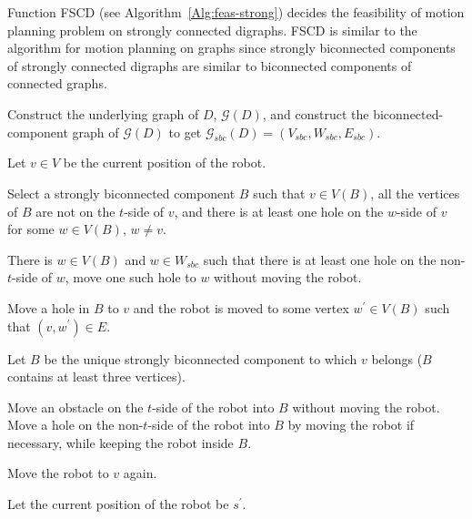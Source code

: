 \documentclass{article}
\begin{document}
Function FSCD (see Algorithm~\ref{Alg:feas-strong}) decides the
feasibility of motion planning problem on strongly connected
digraphs. FSCD is similar to the algorithm for motion planning on
graphs since strongly biconnected components of strongly connected
digraphs are similar to biconnected components of connected graphs.
\begin{algorithm}[ht]

\dontprintsemicolon \SetVline




Construct the underlying graph of $D$, $\mathcal{G}(D)$, and
construct the biconnected-component graph of $\mathcal{G}(D)$ to get
$\mathcal{G}_{sbc}(D)=(V_{sbc},W_{sbc},E_{sbc})$.\;

{
Let $v \in V$ be the current position of the robot.\;
{
Select a strongly biconnected component $B$ such that $v \in V(B)$, all the vertices of $B$ are not on the $t$-side of $v$,
    and there is at least one hole on the $w$-side of $v$ for some $w \in V(B)$, $w \ne v$.\;

{
There is $w \in V(B)$ and $w \in W_{sbc}$ such that there is at least one hole on the non-$t$-side of $w$,
      move one such hole to $w$ without moving the robot.
}

    Move a hole in $B$ to $v$ and the robot is moved to some vertex $w^\prime \in V(B)$ such that $(v,w^\prime) \in E$.\;
}
{
Let $B$ be the unique strongly biconnected component to which $v$ belongs ($B$ contains at least three vertices).\;

{
Move an obstacle on the $t$-side of the robot into $B$ without moving the robot.
}
Move a hole on the non-$t$-side of the robot into $B$ by moving the robot if necessary, while keeping the robot inside $B$.\;

    Move the robot to $v$ again.
  }
}
Let the current position of the robot be $s^\prime$.\;


\end{algorithm}
\end{document}

